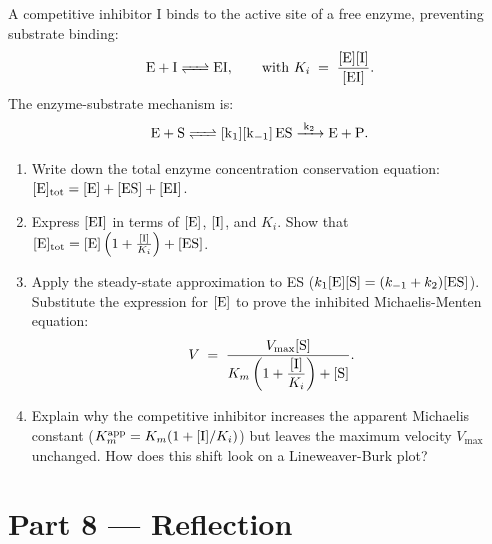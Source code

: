 \documentclass[12pt, a4paper]{book}
\begin{document}
\begin{deepbox}
\begin{enumerate}[label=\textbf{D\arabic*.}]
        A competitive inhibitor I binds to the active site of a free enzyme, preventing substrate binding:
        \[
          \ce{E + I <=> EI}, \qquad \text{with } K_i \;=\; \frac{[\ce{E}][\ce{I}]}{[\ce{EI}]}.
        \]
        The enzyme-substrate mechanism is:
        \[
          \ce{E + S <=> [k_1][k_{-1}] ES ->[k_2] E + P}.
        \]
        \begin{enumerate}[label=(\alph*)]
          \item Write down the total enzyme concentration conservation equation: $[\ce{E}]_{\text{tot}} = [\ce{E}] + [\ce{ES}] + [\ce{EI}]$.
          \item Express $[\ce{EI}]$ in terms of $[\ce{E}]$, $[\ce{I}]$, and $K_i$. Show that $[\ce{E}]_{\text{tot}} = [\ce{E}] \left( 1 + \frac{[\ce{I}]}{K_i} \right) + [\ce{ES}]$.
          \item Apply the steady-state approximation to ES ($k_1[\ce{E}][\ce{S}] = (k_{-1} + k_2)[\ce{ES}]$).
                Substitute the expression for $[\ce{E}]$ to prove the inhibited Michaelis-Menten equation:
                \[
                  V \;=\; \frac{V_{\text{max}} [\ce{S}]}{K_m \left( 1 + \dfrac{[\ce{I}]}{K_i} \right) + [\ce{S}]}.
                \]
          \item Explain why the competitive inhibitor increases the apparent Michaelis constant ($K_m^{\text{app}} = K_m(1 + [\ce{I}]/K_i)$) but leaves the maximum velocity $V_{\text{max}}$ unchanged. How does this shift look on a Lineweaver-Burk plot?
        \end{enumerate}
\end{enumerate}
\end{deepbox}

\newpage

\section{Part 8 --- Reflection}
\end{document}
